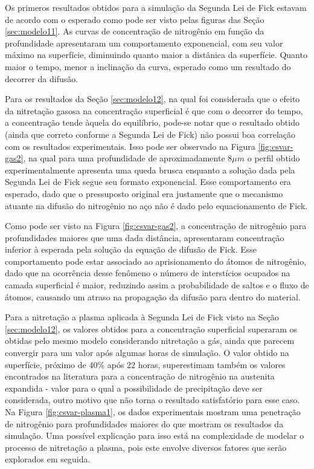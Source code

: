 Os primeros resultados obtidos para a simulação da Segunda Lei de Fick estavam de acordo com o esperado como pode ser visto pelas figuras das Seção \ref{sec:modelo11}. As curvas de concentração de nitrogênio em função da profundidade apresentaram um comportamento exponencial, com seu valor máximo na superfície, diminuindo quanto maior a distânica da superfície. Quanto maior o tempo, menor a inclinação da curva, esperado como um resultado do decorrer da difusão.

Para os resultados da Seção \ref{sec:modelo12}, na qual foi considerada que o efeito da nitretação gasosa na concentração superficial é que com o decorrer do tempo, a concentração tende àquela do equilíbrio, pode-se notar que o resultado obtido (ainda que correto conforme a Segunda Lei de Fick) não possui boa correlação com os resultados experimentais. Isso pode ser observado na Figura \ref{fig:csvar-gas2}, na qual para uma profundidade de aproximadamente 8$\mu m$ o perfil obtido experimentalmente apresenta uma queda brusca enquanto a solução dada pela Segunda Lei de Fick segue seu formato exponencial. Esse comportamento era esperado, dado que o pressuposto original era justamente que o mecanismo atuante na difusão do nitrogênio no aço não é dado pelo equacionamento de Fick.

Como pode ser visto na Figura \ref{fig:csvar-gas2}, a concentração de nitrogênio para profundidades maiores que uma dada distância, apresentaram concentração inferior à esperada pela solução da equação de difusão de Fick. Esse comportamento pode estar associado ao aprisionamento do átomos de nitrogênio, dado que na ocorrência desse fenômeno o número de interstícios ocupados na camada superficial é maior, reduzindo assim a probabilidade de saltos e o fluxo de átomos, causando um atraso na propagação da difusão para dentro do material.

Para a nitretação a plasma aplicada à Segunda Lei de Fick visto na Seção \ref{sec:modelo12}, os valores obtidos para a concentração superficial superaram os obtidas pelo mesmo modelo considerando nitretação a gás, ainda que parecem convergir para um valor após algumas horas de simulação. O valor obtido na superfície, próximo de 40\% após 22 horas, superestimam também os valores encontrados na literatura para a concentração de nitrogênio na austenita expandida - valor para o qual a possibilidade de precipitação deve ser considerada, outro motivo que não torna o resultado satisfatório para esse caso. Na Figura \ref{fig:csvar-plasma1}, os dados experimentais mostram uma penetração de nitrogênio para profundidades maiores do que mostram os resultados da simulação. Uma possível explicação para isso está na complexidade de modelar o processo de nitretação a plasma, pois este envolve diversos fatores que serão explorados em seguida.

